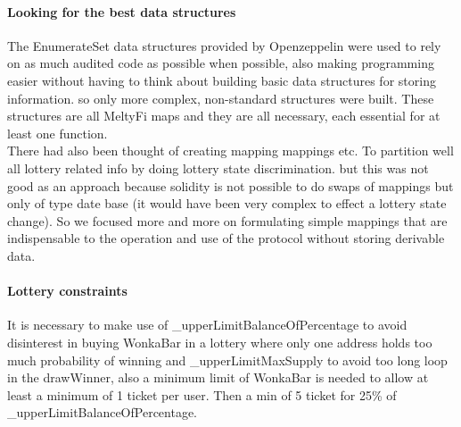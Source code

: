 \paragraph{Looking for the best data structures}
The EnumerateSet data structures provided by Openzeppelin were used to rely on as much audited code as possible when possible, also making programming easier without having to think about building basic data structures for storing information. so only more complex, non-standard structures were built. These structures are all MeltyFi maps and they are all necessary, each essential for at least one function. 
\\
\indent There had also been thought of creating mapping mappings etc. To partition well all lottery related info by doing lottery state discrimination. but this was not good as an approach because solidity is not possible to do swaps of mappings but only of type date base (it would have been very complex to effect a lottery state change). So we focused more and more on formulating simple mappings that are indispensable to the operation and use of the protocol without storing derivable data. 

\paragraph{Lottery constraints}
It is necessary to make use of \_upperLimitBalanceOfPercentage to avoid disinterest in buying WonkaBar in a lottery where only one address holds too much probability of winning and \_upperLimitMaxSupply to avoid too long loop in the drawWinner, also a minimum limit of WonkaBar is needed to allow at least a minimum of 1 ticket per user. Then a min of 5 ticket for 25\% of \_upperLimitBalanceOfPercentage.

